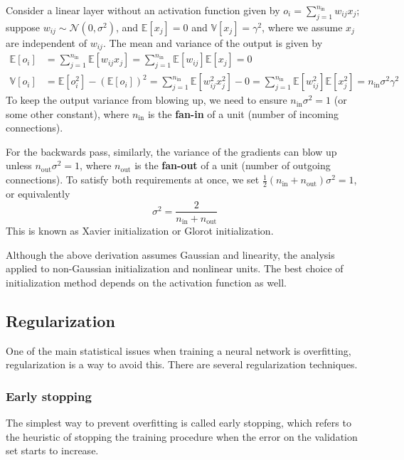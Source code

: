\documentclass[11pt]{article}
\begin{document}
Consider a linear layer without an activation function given by $o_i = \sum_{j=1}^{n_{\text{in}}} w_{ij} x_j$; suppose $w_{ij} \sim \mathcal{N}(0, \sigma^2)$, and $\mathbb{E}[x_j] = 0$ and $\mathbb{V}[x_j] = \gamma^2$, where we assume $x_j$ are independent of $w_{ij}$. The mean and variance of the output is given by
\[
\begin{aligned}
\mathbb{E}[o_i] &= \sum_{j=1}^{n_{\text{in}}} \mathbb{E}[w_{ij} x_j] = \sum_{j=1}^{n_{\text{in}}} \mathbb{E}[w_{ij}] \mathbb{E}[x_j] = 0 \\
\mathbb{V}[o_i] &= \mathbb{E}[o_i^2] - (\mathbb{E}[o_i])^2 = \sum_{j=1}^{n_{\text{in}}} \mathbb{E}[w_{ij}^2 x_j^2] - 0 = \sum_{j=1}^{n_{\text{in}}} \mathbb{E}[w_{ij}^2] \mathbb{E}[x_j^2] = n_{\text{in}} \sigma^2 \gamma^2
\end{aligned}
\]
To keep the output variance from blowing up, we need to ensure $n_{\text{in}} \sigma^2 = 1$ (or some other constant), where $n_{\text{in}}$ is the \textbf{fan-in} of a unit (number of incoming connections).

For the backwards pass, similarly, the variance of the gradients can blow up unless $n_{\text{out}} \sigma^2 = 1$, where $n_{\text{out}}$ is the \textbf{fan-out} of a unit (number of outgoing connections). To satisfy both requirements at once, we set $\frac{1}{2}(n_{\text{in}} + n_{\text{out}}) \sigma^2 = 1$, or equivalently
\[
\sigma^2 = \frac{2}{n_{\text{in}} + n_{\text{out}}}
\]
This is known as Xavier initialization or Glorot initialization.

Although the above derivation assumes Gaussian and linearity, the analysis applied to non-Gaussian initialization and nonlinear units. 
The best choice of initialization method depends on the activation function as well.

\subsection{Regularization}
One of the main statistical issues when training a neural network is overfitting, regularization is a way to avoid this.
There are several regularization techniques.

\subsubsection*{Early stopping}
The simplest way to prevent overfitting is called early stopping, which refers to the
heuristic of stopping the training procedure when the error on the validation set starts to increase.
\end{document}
